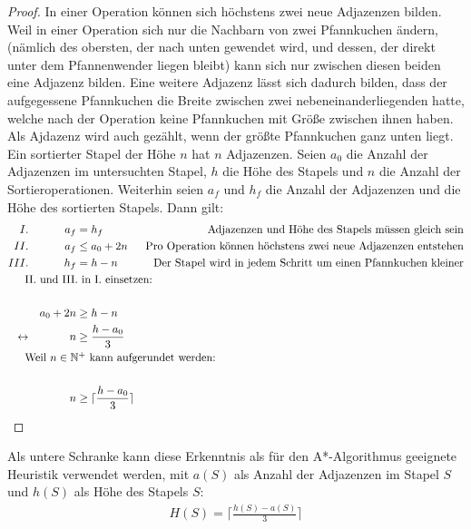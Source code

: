 \documentclass[a4paper,10pt,ngerman]{scrartcl}
\begin{document}
\begin{proof}
  In einer Operation können sich höchstens zwei neue Adjazenzen bilden. Weil in einer Operation sich nur die Nachbarn von zwei
  Pfannkuchen ändern, (nämlich des obersten, der nach unten gewendet wird, und dessen, der direkt unter dem Pfannenwender liegen bleibt)
  kann sich nur zwischen diesen beiden eine Adjazenz bilden. Eine weitere Adjazenz lässt sich dadurch bilden, dass der aufgegessene
  Pfannkuchen die Breite zwischen zwei nebeneinanderliegenden hatte, welche nach der Operation keine Pfannkuchen mit Größe zwischen ihnen haben.
  Als Ajdazenz wird auch gezählt, wenn der größte Pfannkuchen ganz unten liegt. Ein sortierter Stapel der Höhe $n$ hat $n$ Adjazenzen.
  Seien $a_0$ die Anzahl der Adjazenzen im untersuchten Stapel, $h$ die Höhe des Stapels und $n$ die Anzahl der Sortieroperationen. Weiterhin seien
  $a_f$ und $h_f$ die Anzahl der Adjazenzen und die Höhe des sortierten Stapels. Dann gilt:
  \begin{align*}
    I.              &  & a_f      & = h_f                              & \text{Adjazenzen und Höhe des Stapels müssen gleich sein}            \\
    II.             &  & a_f      & \leq a_0 + 2n                      & \text{Pro Operation können höchstens zwei neue Adjazenzen entstehen} \\
    III.            &  & h_f      & = h - n                            & \text{Der Stapel wird in jedem Schritt um einen Pfannkuchen kleiner} \\
    \noalign{II. und III. in I. einsetzen:}                                                                                                   \\
                    &  & a_0 + 2n & \geq h - n                         &                                                                      \\
    \leftrightarrow &  & n        & \geq \frac{h - a_0}{3}                                                                                    \\
    \noalign{Weil $n \in \mathbb{N}^+$ kann aufgerundet werden:}                                                                              \\
                    &  & n        & \geq \lceil\frac{h - a_0}{3}\rceil                                                                        \\
  \end{align*}
\end{proof}
Als untere Schranke kann diese Erkenntnis als für den A*-Algorithmus geeignete Heuristik verwendet werden,
mit $a(S)$ als Anzahl der Adjazenzen im Stapel $S$ und $h(S)$ als Höhe des Stapels $S$:
\begin{align*}
  H(S) = \lceil\frac{h(S) - a(S)}{3}\rceil
\end{align*}
\end{document}
